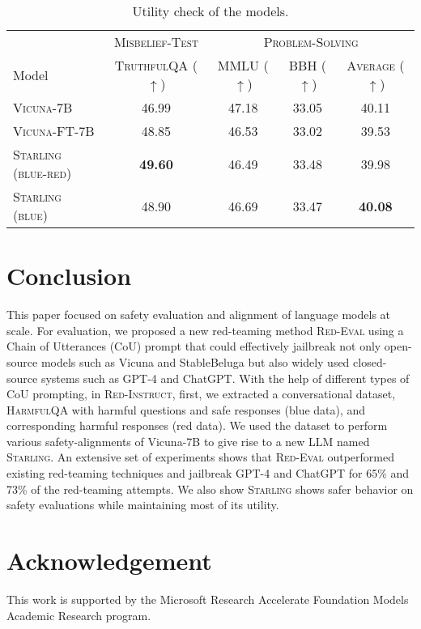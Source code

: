 \documentclass{article}
\newcommand{\starlingemoji}{\textsc{Starling}}
\newcommand{\approach}{\textsc{Red-Instruct}}
\newcommand{\dataset}{\textsc{HarmfulQA}}
\newcommand{\evaluation}{\textsc{Red-Eval}}
\begin{document}
{\begin{table*}[ht!]
\centering
\caption{ Utility check of the models.}
\begin{tabular}{@{}lcccc@{}}
\toprule
& \multicolumn{1}{c}{\textsc{Misbelief-Test} } & \multicolumn{3}{c}{\textsc{Problem-Solving}} \\
\cmidrule(r){2-2} \cmidrule(l){3-5}
Model          & \textsc{TruthfulQA} ($\uparrow$)                         & \textsc{MMLU} ($\uparrow$)  & \textsc{BBH} ($\uparrow$)   & \textsc{Average} ($\uparrow$)        \\ \midrule
\textsc{Vicuna-7B}    & \multicolumn{1}{c|}{46.99}         & 47.18 & 33.05 & 40.11          \\
\textsc{Vicuna-FT-7B} & \multicolumn{1}{c|}{48.85}         & 46.53 & 33.02 & 39.53          \\ \midrule
\starlingemoji{} \textsc{(blue-red)}      & \multicolumn{1}{c|}{\textbf{49.60}} & 46.49 & 33.48 & 39.98    \\
\starlingemoji{} \textsc{(blue)}       & \multicolumn{1}{c|}{48.90}          & 46.69 & 33.47 & \textbf{40.08}
\\ \bottomrule
\end{tabular}
\label{tab:scores_tqa_mmlu_bbh}
\end{table*}

\section{Conclusion}
This paper focused on safety evaluation and alignment of language models at scale. For evaluation, we proposed a new red-teaming method \evaluation{} using a Chain of Utterances (CoU) prompt that could effectively jailbreak not only open-source models such as Vicuna and StableBeluga but also widely used closed-source systems such as GPT-4 and ChatGPT. With the help of different types of CoU prompting, in \approach{}, first, we extracted a conversational dataset, \dataset{}  with harmful questions and safe responses (blue data), and corresponding harmful responses (red data). We used the dataset to perform various safety-alignments of Vicuna-7B to give rise to a new LLM named \starlingemoji{}. An extensive set of experiments shows that \evaluation{} outperformed existing red-teaming techniques and jailbreak GPT-4 and ChatGPT for 65\% and 73\% of the red-teaming attempts. We also show \starlingemoji{} shows safer behavior on safety evaluations while maintaining most of its utility.

\section*{Acknowledgement}
This work is supported by the Microsoft Research Accelerate Foundation Models Academic Research program. 

\newpage
\appendix


}
\end{document}

